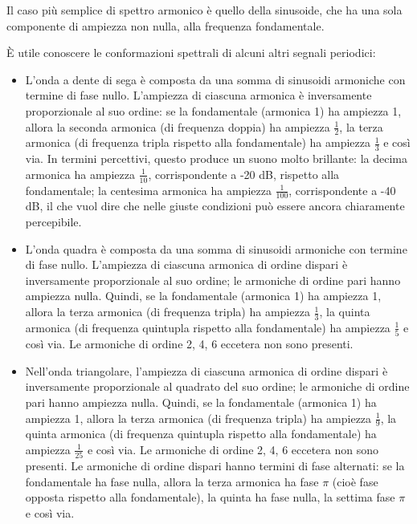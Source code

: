 Il caso più semplice di spettro armonico è quello della sinusoide, che ha una sola componente di ampiezza non nulla, alla frequenza fondamentale.

È utile conoscere le conformazioni spettrali di alcuni altri segnali periodici:

\begin{itemize}

\item L'onda a dente di sega è composta da una somma di sinusoidi armoniche con termine di fase nullo. L'ampiezza di ciascuna armonica è inversamente proporzionale al suo ordine: se la fondamentale (armonica 1) ha ampiezza 1, allora la seconda armonica (di frequenza doppia) ha ampiezza $\frac{1}{2}$, la terza armonica (di frequenza tripla rispetto alla fondamentale) ha ampiezza $\frac{1}{3}$ e così via. In termini percettivi, questo produce un suono molto brillante: la decima armonica ha ampiezza $\frac{1}{10}$, corrispondente a -20 dB, rispetto alla fondamentale; la centesima armonica ha ampiezza $\frac{1}{100}$, corrispondente a -40 dB, il che vuol dire che nelle giuste condizioni può essere ancora chiaramente percepibile.

\item L'onda quadra è composta da una somma di sinusoidi armoniche con termine di fase nullo. L'ampiezza di ciascuna armonica di ordine dispari è inversamente proporzionale al suo ordine; le armoniche di ordine pari hanno ampiezza nulla. Quindi, se la fondamentale (armonica 1) ha ampiezza 1, allora la terza armonica (di frequenza tripla) ha ampiezza $\frac{1}{3}$, la quinta armonica (di frequenza quintupla rispetto alla fondamentale) ha ampiezza $\frac{1}{5}$ e così via. Le armoniche di ordine 2, 4, 6 eccetera non sono presenti.

\item Nell'onda triangolare, l'ampiezza di ciascuna armonica di ordine dispari è inversamente proporzionale al quadrato del suo ordine; le armoniche di ordine pari hanno ampiezza nulla. Quindi, se la fondamentale (armonica 1) ha ampiezza 1, allora la terza armonica (di frequenza tripla) ha ampiezza $\frac{1}{9}$, la quinta armonica (di frequenza quintupla rispetto alla fondamentale) ha ampiezza $\frac{1}{25}$ e così via. Le armoniche di ordine 2, 4, 6 eccetera non sono presenti. Le armoniche di ordine dispari hanno termini di fase alternati: se la fondamentale ha fase nulla, allora la terza armonica ha fase $\pi$ (cioè fase opposta rispetto alla fondamentale), la quinta ha fase nulla, la settima fase $\pi$ e così via.


\end{itemize}
